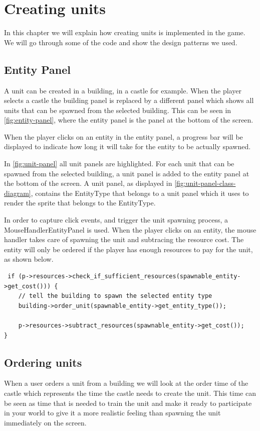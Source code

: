 \section{Creating units}
In this chapter we will explain how creating units is implemented in the game. We will go through some of the code and show the design patterns we used.

\subsection{Entity Panel} \label{EntityPanel}
A unit can be created in a building, in a castle for example. When the player selects a castle the building panel is replaced by a different panel which shows all units that can be spawned from the selected building. This can be seen in \cref{fig:entity-panel}, where the entity panel is the panel at the bottom of the screen. 

When the player clicks on an entity in the entity panel, a progress bar will be displayed to indicate how long it will take for the entity to be actually spawned.

In \cref{fig:unit-panel} all unit panels are highlighted. For each unit that can be spawned from the selected building, a unit panel is added to the entity panel at the bottom of the screen. A unit panel, as displayed in \cref{fig:unit-panel-class-diagram}, contains the EntityType that belongs to a unit panel which it uses to render the sprite that belongs to the EntityType.

In order to capture click events, and trigger the unit spawning process, a MouseHandlerEntityPanel is used. When the player clicks on an entity, the mouse handler takes care of spawning the unit and subtracing the resource cost. The entity will only be ordered if the player has enough resources to pay for the unit, as shown below.

\begin{lstlisting}
 if (p->resources->check_if_sufficient_resources(spawnable_entity->get_cost())) {
    // tell the building to spawn the selected entity type
    building->order_unit(spawnable_entity->get_entity_type());
    
    p->resources->subtract_resources(spawnable_entity->get_cost());
}
\end{lstlisting}

\subsection{Ordering units}
When a user orders a unit from a building we will look at the order time of the castle which represents the time the castle needs to create the unit. This time can be seen as time that is needed to train the unit and make it ready to participate in your world to give it a more realistic feeling than spawning the unit immediately on the screen. 

